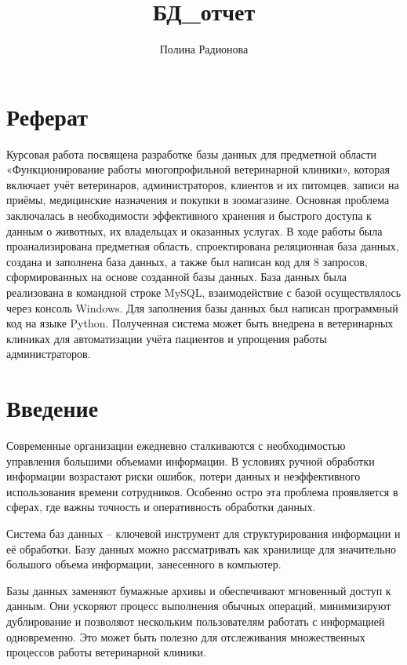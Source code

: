 \documentclass[a4paper]{article}
\begin{document}
\title{БД_отчет}
\author{Полина Радионова}


	
\setcounter{page}{2}
\newpage
\section*{Реферат}
Курсовая работа посвящена разработке базы данных для предметной области «Функционирование работы многопрофильной ветеринарной клиники», которая включает учёт ветеринаров, администраторов, клиентов и их питомцев, записи на приёмы, медицинские назначения и покупки в зоомагазине. Основная проблема заключалась в необходимости эффективного хранения и быстрого доступа к данным о животных, их владельцах и оказанных услугах. В ходе работы была проанализирована предметная область, спроектирована реляционная база данных, создана и заполнена база данных, а также был написан код для 8 запросов, сформированных на основе созданной базы данных. База данных была реализована в командной строке MySQL, взаимодействие с базой осуществлялось через консоль Windows. Для заполнения базы данных был написан программный код на языке Python. Полученная система может быть внедрена в ветеринарных клиниках для автоматизации учёта пациентов и упрощения работы администраторов.

\newpage
{\small \tableofcontents}

\newpage
\section*{Введение}
Современные организации ежедневно сталкиваются с необходимостью управления большими объемами информации. В условиях ручной обработки информации возрастают риски ошибок, потери данных и неэффективного использования времени сотрудников. Особенно остро эта проблема проявляется в сферах, где важны точность и оперативность обработки данных.

Система баз данных -- ключевой инструмент для структурирования информации и её обработки. Базу данных можно рассматривать как хранилище для значительно большого объема информации, занесенного в компьютер. 

Базы данных заменяют бумажные архивы и обеспечивают мгновенный доступ к данным. Они ускоряют процесс выполнения обычных операций, минимизируют дублирование и позволяют нескольким пользователям работать с информацией одновременно. Это может быть полезно для отслеживания множественных процессов работы ветеринарной клиники.
\end{document}

